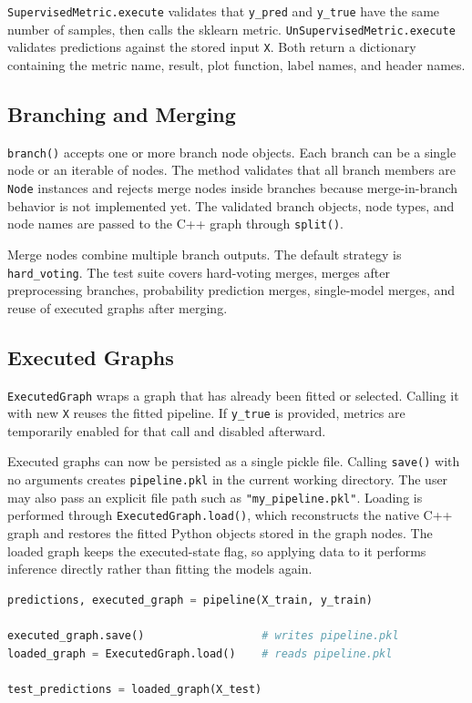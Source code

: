 \documentclass[11pt,a4paper]{article}
\begin{document}
\texttt{SupervisedMetric.execute} validates that \texttt{y\_pred} and
\texttt{y\_true} have the same number of samples, then calls the sklearn metric.
\texttt{UnSupervisedMetric.execute} validates predictions against the stored
input \texttt{X}. Both return a dictionary containing the metric name, result,
plot function, label names, and header names.

\subsection{Branching and Merging}

\texttt{branch()} accepts one or more branch node objects. Each branch can be a
single node or an iterable of nodes. The method validates that all branch
members are \texttt{Node} instances and rejects merge nodes inside branches
because merge-in-branch behavior is not implemented yet. The validated branch
objects, node types, and node names are passed to the C++ graph through
\texttt{split()}.

Merge nodes combine multiple branch outputs. The default strategy is
\texttt{hard\_voting}. The test suite covers hard-voting merges, merges after
preprocessing branches, probability prediction merges, single-model merges, and
reuse of executed graphs after merging.

\subsection{Executed Graphs}

\texttt{ExecutedGraph} wraps a graph that has already been fitted or selected.
Calling it with new \texttt{X} reuses the fitted pipeline. If \texttt{y\_true}
is provided, metrics are temporarily enabled for that call and disabled
afterward.

Executed graphs can now be persisted as a single pickle file. Calling
\texttt{save()} with no arguments creates \texttt{pipeline.pkl} in the current
working directory. The user may also pass an explicit file path such as
\texttt{"my\_pipeline.pkl"}. Loading is performed through
\texttt{ExecutedGraph.load()}, which reconstructs the native C++ graph and
restores the fitted Python objects stored in the graph nodes. The loaded graph
keeps the executed-state flag, so applying data to it performs inference
directly rather than fitting the models again.

\begin{lstlisting}[language=Python]
predictions, executed_graph = pipeline(X_train, y_train)

executed_graph.save()                  # writes pipeline.pkl
loaded_graph = ExecutedGraph.load()    # reads pipeline.pkl

test_predictions = loaded_graph(X_test)
\end{lstlisting}
\end{document}
